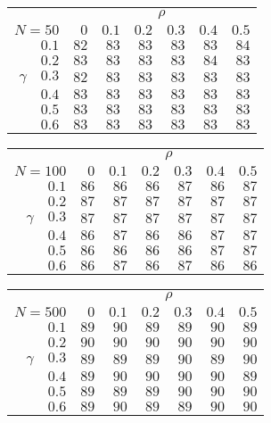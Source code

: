 \begin{tabular}{r|rrrrrr}
\hline\hline
 &\multicolumn{6}{c}{$\rho$} \\ 
 $N = 50$ & $0$ & $0.1$ & $0.2$ & $0.3$ & $0.4$ & $0.5$ \\ 
 \hline$0.1$ & $82$ & $83$ & $83$ & $83$ & $83$ & $84$\\ 
$0.2$ & $83$ & $83$ & $83$ & $83$ & $84$ & $83$\\ 
$\gamma\quad$$0.3$ & $82$ & $83$ & $83$ & $83$ & $83$ & $83$\\ 
$0.4$ & $83$ & $83$ & $83$ & $83$ & $83$ & $83$\\ 
$0.5$ & $83$ & $83$ & $83$ & $83$ & $83$ & $83$\\ 
$0.6$ & $83$ & $83$ & $83$ & $83$ & $83$ & $83$\\ 
 \hline 
 \end{tabular}
 
 \vspace{2em} 
 
\begin{tabular}{r|rrrrrr}
\hline\hline
 &\multicolumn{6}{c}{$\rho$} \\ 
 $N = 100$ & $0$ & $0.1$ & $0.2$ & $0.3$ & $0.4$ & $0.5$ \\ 
 \hline$0.1$ & $86$ & $86$ & $86$ & $87$ & $86$ & $87$\\ 
$0.2$ & $87$ & $87$ & $87$ & $87$ & $87$ & $87$\\ 
$\gamma\quad$$0.3$ & $87$ & $87$ & $87$ & $87$ & $87$ & $87$\\ 
$0.4$ & $86$ & $87$ & $86$ & $86$ & $87$ & $87$\\ 
$0.5$ & $86$ & $86$ & $86$ & $86$ & $87$ & $87$\\ 
$0.6$ & $86$ & $87$ & $86$ & $87$ & $86$ & $86$\\ 
 \hline 
 \end{tabular}
 
 \vspace{2em} 
 
\begin{tabular}{r|rrrrrr}
\hline\hline
 &\multicolumn{6}{c}{$\rho$} \\ 
 $N = 500$ & $0$ & $0.1$ & $0.2$ & $0.3$ & $0.4$ & $0.5$ \\ 
 \hline$0.1$ & $89$ & $90$ & $89$ & $89$ & $90$ & $89$\\ 
$0.2$ & $90$ & $90$ & $90$ & $90$ & $90$ & $90$\\ 
$\gamma\quad$$0.3$ & $89$ & $89$ & $89$ & $90$ & $89$ & $90$\\ 
$0.4$ & $89$ & $90$ & $90$ & $90$ & $90$ & $89$\\ 
$0.5$ & $89$ & $89$ & $89$ & $90$ & $90$ & $90$\\ 
$0.6$ & $89$ & $90$ & $89$ & $89$ & $90$ & $90$\\ 
 \hline 
 \end{tabular}